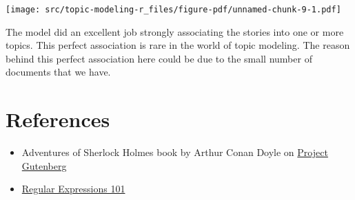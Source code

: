 \documentclass[
  letterpaper,
  DIV=11,
  numbers=noendperiod]{scrreprt}
\providecommand{\tightlist}{%
  \setlength{\itemsep}{0pt}\setlength{\parskip}{0pt}}\usepackage{longtable,booktabs,array}
\begin{document}
\texttt{[image: src/topic-modeling-r\_files/figure-pdf/unnamed-chunk-9-1.pdf]}

The model did an excellent job strongly associating the stories into one
or more topics. This perfect association is rare in the world of topic
modeling. The reason behind this perfect association here could be due
to the small number of documents that we have.

\chapter{References}\label{references-2}

\begin{itemize}
\tightlist
\item
  Adventures of Sherlock Holmes book by Arthur Conan Doyle on
  \href{https://www.gutenberg.org/ebooks/48320}{Project Gutenberg}
\item
  \href{https://regex101.com/}{Regular Expressions 101}
\end{itemize}
\end{document}
